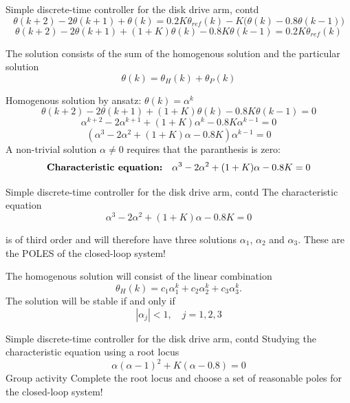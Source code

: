 \documentclass[presentation,aspectratio=1610]{beamer}
\begin{document}
\begin{frame}[label={sec:org8b2241d}]{Simple discrete-time controller for the disk drive arm, contd}
\[ \theta(k+2) - 2\theta(k+1) + \theta(k) = 0.2K\theta_{ref}(k) - K\big(\theta(k) -0.8\theta(k-1)\big) \]
\[ \theta(k+2)-2\theta(k+1) + (1+K)\theta(k) - 0.8K\theta(k-1) = 0.2K\theta_{ref}(k)\]

The solution consists of the sum of the \alert{homogenous solution} and the \alert{particular solution}
\[ \theta(k) = \theta_H(k) + \theta_P(k) \]

\begin{block}{Homogenous solution by \alert{ansatz}: \(\theta(k) = \alpha^k\)}
\[ \theta(k+2)-2\theta(k+1) + (1+K)\theta(k) - 0.8K\theta(k-1) = 0\]
\[ \alpha^{k+2} - 2\alpha^{k+1} + (1+K)\alpha^k - 0.8K\alpha^{k-1} = 0\]
\[ (\alpha^3 - 2\alpha^2 + (1+K)\alpha - 0.8K) \alpha^{k-1} = 0\]
A non-trivial solution \(\alpha \neq 0\) requires that the paranthesis is zero:
\[ \text{\bf Characteristic equation:} \quad \alpha^3 - 2\alpha^2 + (1+K)\alpha - 0.8K = 0\]
\end{block}
\end{frame}


\begin{frame}[label={sec:org2d13fd9}]{Simple discrete-time controller for the disk drive arm, contd}
The characteristic equation 
   \[ \alpha^3 - 2\alpha^2 + (1+K)\alpha - 0.8K = 0\]

is of \alert{third} order and will  therefore have \alert{three} solutions \(\alpha_1\),  \(\alpha_2\) and \(\alpha_3\). These are the \alert{POLES} of  the closed-loop system!

The homogenous solution will consist of the linear combination
\[ \theta_H(k) = c_1 \alpha_1^k + c_2\alpha_2^k + c_3\alpha_3^k.\]
The solution will be stable if and only if 
\[ |\alpha_j| < 1, \quad j=1,2,3\]
\end{frame}

\begin{frame}[label={sec:org70c3d4e}]{Simple discrete-time controller for the disk drive arm, contd}
Studying the characteristic equation using a root locus 
\[ \alpha(\alpha -1)^2 + K(\alpha - 0.8) = 0\]
\alert{Group activity} Complete the root locus and choose a set of reasonable poles for the closed-loop system!

\begin{center}
\end{center}
\end{frame}
\end{document}
